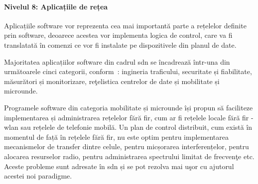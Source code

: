 \paragraph{Nivelul 8: Aplicațiile de rețea}

Aplicațiile software vor reprezenta cea mai importantă parte a rețelelor definite prin software, deoarece acestea vor implementa logica de control, care va fi translatată în comenzi ce vor fi instalate pe dispozitivele din planul de date.

Majoritatea aplicațiilor software din cadrul \gls{sdn} se încadrează într-una din următoarele cinci categorii, conform~\cite{kreutz2015software}: ingineria traficului, securitate și fiabilitate, măsurători și monitorizare, reţelistica centrelor de date și mobilitate și microunde.

Programele software din categoria mobilitate și microunde își propun să faciliteze implementarea și administrarea rețelelor fără fir, cum ar fi rețelele locale fără fir - \gls{wlan} sau rețelele de telefonie mobilă. Un plan de control distribuit, cum există în momentul de față în rețelele fără fir, nu este optim pentru implementarea mecanismelor de transfer dintre celule, pentru micșorarea interferențelor, pentru alocarea resurselor radio, pentru administrarea spectrului limitat de frecvenţe etc. Aceste probleme sunt adresate în \gls{sdn} și se pot rezolva mai uşor cu ajutorul acestei noi paradigme.

